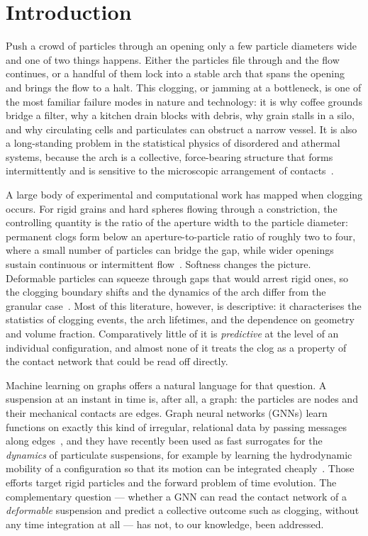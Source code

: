 \documentclass[11pt,a4paper]{article}
\begin{document}
\section{Introduction}
\label{sec:intro}

Push a crowd of particles through an opening only a few particle
diameters wide and one of two things happens. Either the particles file
through and the flow continues, or a handful of them lock into a stable
arch that spans the opening and brings the flow to a halt. This
clogging, or jamming at a bottleneck, is one of the most familiar
failure modes in nature and technology: it is why coffee grounds bridge
a filter, why a kitchen drain blocks with debris, why grain stalls in a
silo, and why circulating cells and particulates can obstruct a narrow
vessel. It is also a long-standing problem in the statistical physics of
disordered and athermal systems, because the arch is a collective,
force-bearing structure that forms intermittently and is sensitive to
the microscopic arrangement of contacts~\citep{dressaire2017clogging,
marin2025clogging}.

A large body of experimental and computational work has mapped when
clogging occurs. For rigid grains and hard spheres flowing through a
constriction, the controlling quantity is the ratio of the aperture
width to the particle diameter: permanent clogs form below an
aperture-to-particle ratio of roughly two to four, where a small number
of particles can bridge the gap, while wider openings sustain
continuous or intermittent flow~\citep{marin2018clogging,
souzy2020transition}. Softness changes the picture. Deformable particles
can squeeze through gaps that would arrest rigid ones, so the clogging
boundary shifts and the dynamics of the arch differ from the granular
case~\citep{hong2017clogging, bielinski2021squeezing}. Most of this
literature, however, is descriptive: it characterises the statistics of
clogging events, the arch lifetimes, and the dependence on geometry and
volume fraction. Comparatively little of it is \emph{predictive} at the
level of an individual configuration, and almost none of it treats the
clog as a property of the contact network that could be read off
directly.

Machine learning on graphs offers a natural language for that question.
A suspension at an instant in time is, after all, a graph: the particles
are nodes and their mechanical contacts are edges. Graph neural networks
(GNNs) learn functions on exactly this kind of irregular, relational
data by passing messages along edges~\citep{gilmer2017neural,
kipf2017semi, hamilton2017inductive}, and they have recently been used as
fast surrogates for the \emph{dynamics} of particulate suspensions, for
example by learning the hydrodynamic mobility of a configuration so that
its motion can be integrated cheaply~\citep{ma2022fast}. Those efforts
target rigid particles and the forward problem of time evolution. The
complementary question --- whether a GNN can read the contact network of
a \emph{deformable} suspension and predict a collective outcome such as
clogging, without any time integration at all --- has not, to our
knowledge, been addressed.
\end{document}
